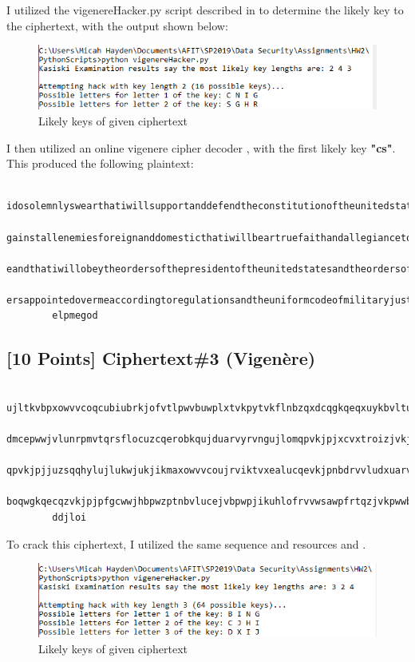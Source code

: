 \documentclass{article}
\begin{document}
I utilized the vigenereHacker.py script described in \cite{CrackingCodes} to determine the likely key to the ciphertext, with the output shown below:

\begin{figure}[h!]
\centering
\includegraphics[scale=1.0]{Images/run_HackVig_1.PNG}
\caption{Likely keys of given ciphertext}
\label{fig:vigOut_1}
\end{figure}

\newpage
I then utilized an online vigenere cipher decoder \cite{Web}, with the first likely key \textbf{"cs"}.
This produced the following plaintext:
	\begin{verbatim}
		idosolemnlyswearthatiwillsupportanddefendtheconstitutionoftheunitedstatesa
        gainstallenemiesforeignanddomesticthatiwillbeartruefaithandallegiancetothesam
        eandthatiwillobeytheordersofthepresidentoftheunitedstatesandtheordersoftheoffic
        ersappointedovermeaccordingtoregulationsandtheuniformcodeofmilitaryjusticesoh
        elpmegod
	\end{verbatim}
	
    \subsection*{[10 Points] Ciphertext\#3 (Vigen\`{e}re)}
    
    \begin{verbatim}
        ujltkvbpxowvvcoqcubiubrkjofvtlpwvbuwplxtvkpytvkflnbzqxdcqgkqeqxuykbvlturvpxtw
        dmcepwwjvlunrpmvtqrsflocuzcqerobkqujduarvyrvngujlomqpvkjpjxcvxtroizjvkjvlohddv
        qpvkjpjjuzsqqhylujlukwjukjikmaxowvvcoujrviktvxealucqevkjpnbdrvvludxuarvuwjnonc
        boqwgkqecqzvkjpjpfgcwwjhbpwzptnbvlucejvbpwpjikuhlofrvvwsawpfrtqzjvkpwwbpbdq
        ddjloi
    \end{verbatim}

To crack this ciphertext, I utilized the same sequence and resources \cite{CrackingCodes} and \cite{Web}.
\begin{figure}[h!]
\centering
\includegraphics[scale=1.0]{Images/run_HackVig_2.PNG}
\caption{Likely keys of given ciphertext}
\label{fig:vigOut_2}
\end{figure}
\end{document}
